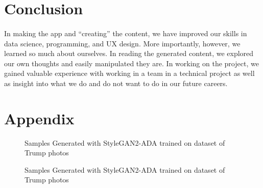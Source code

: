 \documentclass[12pt, letterpaper]{article}
\begin{document}
\section{Conclusion}

\paragraph{}In making the app and “creating” the content, we have improved our skills in data science, programming, and UX design. More importantly, however, we learned so much about ourselves. In reading the generated content, we explored our own thoughts and easily manipulated they are. In working on the project, we gained valuable experience with working in a team in a technical project as well as insight into what we do and do not want to do in our future careers.

\section*{Appendix}

\begin{figure}[h]
	\begin{center}
    	\qquad
    	\qquad
    	\qquad
	\end{center}
      
    \caption{Samples Generated with StyleGAN2-ADA trained on dataset of Trump photos}
    \label{trump}
    
\end{figure}

\begin{figure}[h]
	\begin{center}
    	\qquad
    	\qquad
    	\qquad
    	\qquad
	\end{center}
      
    \caption{Samples Generated with StyleGAN2-ADA trained on dataset of Trump photos}
    \label{trump}
    
\end{figure}
\end{document}
